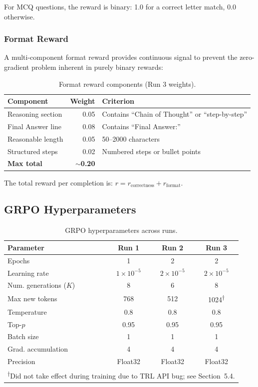 \documentclass[12pt]{report}
\begin{document}
For MCQ questions, the reward is binary: 1.0 for a correct letter match, 0.0 otherwise.

\subsubsection{Format Reward}

A multi-component format reward provides continuous signal to prevent the zero-gradient problem inherent in purely binary rewards:

\begin{table}[H]
\centering
\caption{Format reward components (Run 3 weights).}
\label{tab:format_reward}
\begin{tabular}{lrl}
\toprule
\textbf{Component} & \textbf{Weight} & \textbf{Criterion} \\
\midrule
Reasoning section & 0.05 & Contains ``Chain of Thought'' or ``step-by-step'' \\
Final Answer line & 0.08 & Contains ``Final Answer:'' \\
Reasonable length & 0.05 & 50--2000 characters \\
Structured steps & 0.02 & Numbered steps or bullet points \\
\midrule
\textbf{Max total} & \textbf{$\sim$0.20} & \\
\bottomrule
\end{tabular}
\end{table}

The total reward per completion is: $r = r_{\text{correctness}} + r_{\text{format}}$.

\subsection{GRPO Hyperparameters}

\begin{table}[H]
\centering
\caption{GRPO hyperparameters across runs.}
\label{tab:grpo_hp}
\begin{tabular}{lccc}
\toprule
\textbf{Parameter} & \textbf{Run 1} & \textbf{Run 2} & \textbf{Run 3} \\
\midrule
Epochs & 1 & 2 & 2 \\
Learning rate & $1 \times 10^{-5}$ & $2 \times 10^{-5}$ & $2 \times 10^{-5}$ \\
Num. generations ($K$) & 8 & 6 & 8 \\
Max new tokens & 768 & 512 & 1024\textsuperscript{$\dagger$} \\
Temperature & 0.8 & 0.8 & 0.8 \\
Top-$p$ & 0.95 & 0.95 & 0.95 \\
Batch size & 1 & 1 & 1 \\
Grad. accumulation & 4 & 4 & 4 \\
Precision & Float32 & Float32 & Float32 \\
\bottomrule
\multicolumn{4}{l}{\textsuperscript{$\dagger$}\small{Did not take effect during training due to TRL API bug; see Section~5.4.}}
\end{tabular}
\end{table}
\end{document}
